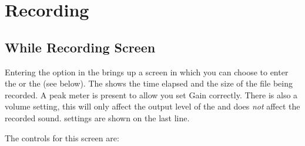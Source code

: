 \section{\label{ref:Recording}Recording}
\subsection{\label{ref:Whilerecordingscreen}While Recording Screen}

Entering the  option in the  brings up
a screen in which you can choose to enter the  or
the  (see below). The 
shows the time elapsed and the size of the file being recorded. A peak meter
is present to allow you set Gain correctly. There is also a volume setting,
this will only affect the output level of the \dap{} and does \emph{not}
affect the recorded sound.
 settings are shown on the last line.

The controls for this screen are:

